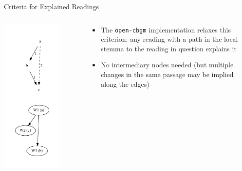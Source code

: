 \documentclass[10pt]{beamer}
\begin{document}
	\begin{frame}{Criteria for Explained Readings}
		\begin{columns}
			\begin{column}{0.4\textwidth}
				\centering
				\includegraphics[width=0.75\textwidth]{../graphics/transitivity-example.pdf}
			\end{column}
			\begin{column}{0.55\textwidth}
				\begin{itemize}
					\item The \texttt{open-cbgm} implementation relaxes this criterion: any reading with a path in the local stemma to the reading in question explains it
					\item No intermediary nodes needed (but multiple changes in the same passage may be implied along the edges)
				\end{itemize}
			\end{column}
		\end{columns}
	\end{frame}
\end{document}
